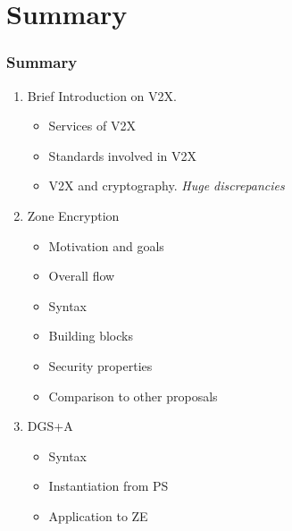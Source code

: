 \documentclass{beamer}
\begin{document}
    \section{Summary}
    \begin{frame}
        \frametitle{Summary}
        \begin{enumerate}
            \item<1-> Brief Introduction on V2X.
            \begin{itemize}
                \item Services of V2X
                \item Standards involved in V2X
                \item V2X and cryptography. \emph{Huge discrepancies}
            \end{itemize}
            \item<2-> Zone Encryption
            \begin{itemize}
                \item Motivation and goals
                \item Overall flow
                \item Syntax
                \item Building blocks
                \item Security properties
                \item Comparison to other proposals
            \end{itemize}
            \item<3-> DGS+A
            \begin{itemize}
                \item Syntax
                \item Instantiation from PS
                \item Application to ZE
            \end{itemize}
        \end{enumerate}
    \end{frame}

    \appendix
\end{document}
